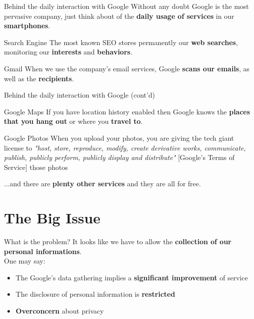 \documentclass[11pt, british]{beamer}
\begin{document}
	\begin{frame}{Behind the daily interaction with Google}
		Without any doubt \alert{Google} is the most pervasive company, just 
		think about of the \textbf{daily usage of services} in our 
		\textbf{smartphones}.
		
		\begin{alertblock}{Search Engine}
			The most known SEO stores permanently our \textbf{web searches}, 
			monitoring 
			our \textbf{interests} and \textbf{behaviors}. 
		\end{alertblock}

		\begin{alertblock}{Gmail}
			When we use the company's email services, Google \textbf{scans our 
			emails}, 
			as well as the \textbf{recipients}. 
		\end{alertblock}		
	\end{frame}
	
	\begin{frame}{Behind the daily interaction with Google (cont'd)}
		\begin{alertblock}{Google Maps}
			 If you have location history enabled then Google knows the 
			 \textbf{places 
			 that you hang out} or where you \textbf{travel to}.   
		\end{alertblock}
		
		\begin{alertblock}{Google Photos}
			When you upload your photos, you are giving the tech giant license 
			to \emph{"host, store, reproduce, modify, create derivative works, 
			communicate, publish, publicly perform, publicly display and 
			distribute"} [Google’s Terms of Service] those photos   
		\end{alertblock}
	...and there are \textbf{plenty other services} and they are all \alert{for 
	free}.		
	\end{frame}
	
	\section{The Big Issue}
	
		\begin{frame}{What is the problem?}
			It looks like we have to allow the \textbf{collection of our 
			personal informations}.
			\\ 
			One may say:
			\begin{itemize}
				\item The Google's data gathering implies a 
				\textbf{significant improvement} 
				of service
				\item The disclosure of personal 
				information is \textbf{restricted}
				\item \textbf{Overconcern} about \alert{privacy}
			\end{itemize}
		\end{frame}
		
\end{document}
